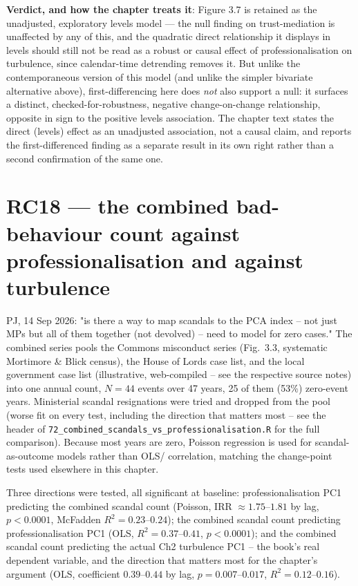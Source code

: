 \textbf{Verdict, and how the chapter treats it}: Figure 3.7 is retained as the unadjusted,
exploratory levels model --- the null finding on trust-mediation is unaffected by any of this, and
the quadratic direct relationship it displays in levels should still not be read as a robust or
causal effect of professionalisation on turbulence, since calendar-time detrending removes it.
But unlike the contemporaneous version of this model (and unlike the simpler bivariate
alternative above), first-differencing here does \emph{not} also support a null: it surfaces a
distinct, checked-for-robustness, negative change-on-change relationship, opposite in sign to the
positive levels association. The chapter text states the direct (levels) effect as an unadjusted
association, not a causal claim, and reports the first-differenced finding as a separate result in
its own right rather than a second confirmation of the same one.

\section{RC18 --- the combined bad-behaviour count against professionalisation and against
turbulence}

PJ, 14 Sep 2026: "is there a way to map scandals to the PCA index -- not just MPs but all of them
together (not devolved) -- need to model for zero cases." The combined series pools the Commons
misconduct series (Fig.\ 3.3, systematic Mortimore \& Blick census), the House of Lords case list,
and the local government case list (illustrative, web-compiled -- see the respective source
notes) into one annual count, $N=44$ events over 47 years, 25 of them (53\%) zero-event years.
Ministerial scandal resignations were tried and dropped from the pool (worse fit on every test,
including the direction that matters most -- see the header of
\texttt{72\_combined\_scandals\_vs\_professionalisation.R} for the full comparison). Because most
years are zero, Poisson regression is used for scandal-as-outcome models rather than OLS/
correlation, matching the change-point tests used elsewhere in this chapter.

Three directions were tested, all significant at baseline: professionalisation PC1 predicting the
combined scandal count (Poisson, IRR $\approx1.75$--$1.81$ by lag, $p<0.0001$, McFadden
$R^2=0.23$--$0.24$); the combined scandal count predicting professionalisation PC1 (OLS,
$R^2=0.37$--$0.41$, $p<0.0001$); and the combined scandal count predicting the actual Ch2
turbulence PC1 -- the book's real dependent variable, and the direction that matters most for the
chapter's argument (OLS, coefficient $0.39$--$0.44$ by lag, $p=0.007$--$0.017$,
$R^2=0.12$--$0.16$).

